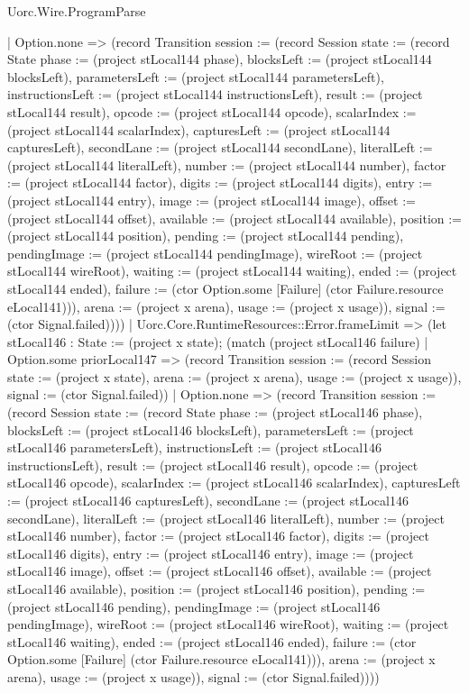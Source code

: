 \begin{lexlean}{Uorc.Wire.ProgramParse}
\begin{semanticmodule}
{        | Option.none => (record Transition {session := (record Session {state := (record State {phase := (project stLocal144 phase), blocksLeft := (project stLocal144 blocksLeft), parametersLeft := (project stLocal144 parametersLeft), instructionsLeft := (project stLocal144 instructionsLeft), result := (project stLocal144 result), opcode := (project stLocal144 opcode), scalarIndex := (project stLocal144 scalarIndex), capturesLeft := (project stLocal144 capturesLeft), secondLane := (project stLocal144 secondLane), literalLeft := (project stLocal144 literalLeft), number := (project stLocal144 number), factor := (project stLocal144 factor), digits := (project stLocal144 digits), entry := (project stLocal144 entry), image := (project stLocal144 image), offset := (project stLocal144 offset), available := (project stLocal144 available), position := (project stLocal144 position), pending := (project stLocal144 pending), pendingImage := (project stLocal144 pendingImage), wireRoot := (project stLocal144 wireRoot), waiting := (project stLocal144 waiting), ended := (project stLocal144 ended), failure := (ctor Option.some [Failure] (ctor Failure.resource eLocal141))}), arena := (project x arena), usage := (project x usage)}), signal := (ctor Signal.failed)})))
      | Uorc.Core.RuntimeResources::Error.frameLimit => (let stLocal146 : State := (project x state); (match (project stLocal146 failure)
        | Option.some priorLocal147 => (record Transition {session := (record Session {state := (project x state), arena := (project x arena), usage := (project x usage)}), signal := (ctor Signal.failed)})
        | Option.none => (record Transition {session := (record Session {state := (record State {phase := (project stLocal146 phase), blocksLeft := (project stLocal146 blocksLeft), parametersLeft := (project stLocal146 parametersLeft), instructionsLeft := (project stLocal146 instructionsLeft), result := (project stLocal146 result), opcode := (project stLocal146 opcode), scalarIndex := (project stLocal146 scalarIndex), capturesLeft := (project stLocal146 capturesLeft), secondLane := (project stLocal146 secondLane), literalLeft := (project stLocal146 literalLeft), number := (project stLocal146 number), factor := (project stLocal146 factor), digits := (project stLocal146 digits), entry := (project stLocal146 entry), image := (project stLocal146 image), offset := (project stLocal146 offset), available := (project stLocal146 available), position := (project stLocal146 position), pending := (project stLocal146 pending), pendingImage := (project stLocal146 pendingImage), wireRoot := (project stLocal146 wireRoot), waiting := (project stLocal146 waiting), ended := (project stLocal146 ended), failure := (ctor Option.some [Failure] (ctor Failure.resource eLocal141))}), arena := (project x arena), usage := (project x usage)}), signal := (ctor Signal.failed)})))
}
\end{semanticmodule}
\end{lexlean}
